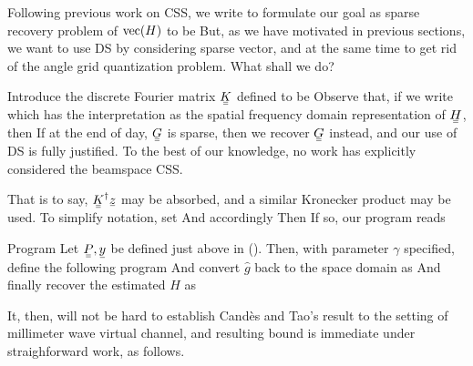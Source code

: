 Following previous work on CSS, we write
%
%
to formulate our goal as sparse recovery problem of \(\mathrm{vec} (H)\) to be
%
%
But, as we have motivated in previous sections, we want to use DS by considering sparse vector, and at the same time to get rid of the angle grid quantization problem.
What shall we do?

Introduce the discrete Fourier matrix \(\M{K}\) defined to be
%
%
Observe that, if we write
%
%
which has the interpretation as the spatial frequency domain representation of \(\M{H}\), then
%
%
If at the end of day, \(\M{G}\) is sparse, then we recover \(\M{G}\) instead, and our use of DS is fully justified.
To the best of our knowledge, no work has explicitly considered the beamspace CSS.

That is to say, \(\M{K}^\H \V{z}\) may be absorbed, and a similar Kronecker product may be used.
To simplify notation, set 
%
%
And accordingly
%
Then
%
%
If so, our program reads

\Result
{Program}
{
Let \(\M{P}, \V{y}\) be defined just above in ().
Then, with parameter \(\gamma\) specified, define the following program
%
%
And convert \(\hat{g}\) back to the space domain as
%
%
And finally recover the estimated \(H\) as
%
%
}

It, then, will not be hard to establish Cand\`es and Tao's result to the setting of millimeter wave virtual channel, and resulting bound is immediate under straighforward work, as follows.
